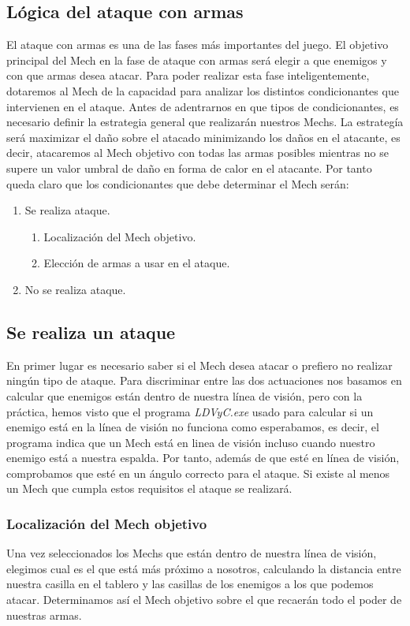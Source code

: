 \documentclass[a4paper,12pt,oneside]{book}
\begin{document}
\subsection{Lógica del ataque con armas}
El ataque con armas es una de las fases más importantes del juego.  El objetivo principal del Mech en la fase de ataque con armas será elegir a que enemigos y con que armas desea atacar.
Para poder realizar esta fase inteligentemente, dotaremos al Mech de la capacidad para analizar los distintos condicionantes que intervienen en el ataque. 
Antes de adentrarnos en que tipos de condicionantes, es necesario definir la estrategia general que realizarán nuestros Mechs. La estrategía será maximizar el daño sobre el atacado minimizando los daños en el atacante, es decir, atacaremos al Mech objetivo con todas las armas posibles mientras no se supere un valor umbral de daño en forma de calor en el atacante. 
Por tanto queda claro que los condicionantes que debe determinar el Mech serán:
\begin{enumerate}
\item Se realiza ataque.
\begin{enumerate}
\item Localización del Mech objetivo.
\item Elección de armas a usar en el ataque.
\end{enumerate}
\item No se realiza ataque.
\end{enumerate}
\subsection*{Se realiza un ataque}
En primer lugar es necesario saber si el Mech desea atacar o prefiero no realizar ningún tipo de ataque. Para discriminar entre las dos actuaciones nos basamos en calcular que enemigos están dentro de nuestra línea de visión, pero con la práctica, hemos visto que el programa \textit{LDVyC.exe} usado para calcular si un enemigo está en la línea de visión no funciona como esperabamos, es decir, el programa indica que un Mech está en linea de visión incluso cuando nuestro enemigo está a nuestra espalda. Por tanto, además de que esté en línea de visión, comprobamos que esté en un ángulo correcto para el ataque. Si existe al menos un Mech que cumpla estos requisitos el ataque se realizará. 

\subsubsection*{Localización del Mech objetivo}
Una vez seleccionados los Mechs que están dentro de nuestra línea de visión, elegimos cual es el que está más próximo a nosotros, calculando la distancia entre nuestra casilla en el tablero y las casillas de los enemigos a los que podemos atacar. Determinamos así el Mech objetivo sobre el que recaerán todo el poder de nuestras armas.
\end{document}
